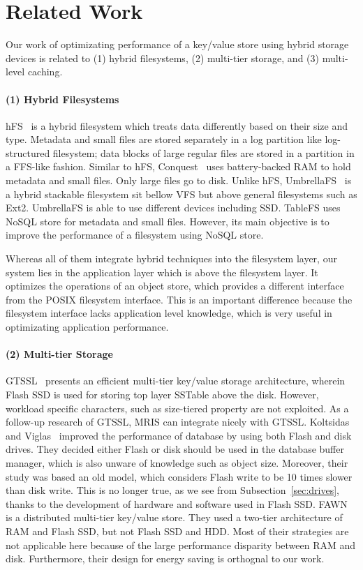 \section{Related Work} 
\label{sec:related} 
Our work of optimizating performance of a key/value store using hybrid
storage devices is related to (1) hybrid filesystems, (2) multi-tier
storage, and (3) multi-level caching. 

\paragraph{(1) Hybrid Filesystems}

hFS~\cite{eurosys_hfs} is a hybrid filesystem which treats data
differently based on their size and type. Metadata and small files are
stored separately in a log partition like log-structured filesystem;
data blocks of large regular files are stored in a partition in a
FFS-like fashion. Similar to hFS, Conquest~\cite{conquest_tos} uses
battery-backed RAM to hold metadata and small files. Only large files
go to disk. Unlike hFS, UmbrellaFS~\cite{umbrellafs_gos} is a hybrid
stackable filesystem sit bellow VFS but above general filesystems such
as Ext2.  UmbrellaFS is able to use different devices including SSD.
TableFS \cite{tablefs} uses NoSQL store for metadata and small files.
However, its main objective is to improve the performance of a
filesystem using NoSQL store.

Whereas all of them integrate hybrid techniques into the filesystem
layer, our system lies in the application layer which is above the
filesystem layer. It optimizes the operations of an object store,
which provides a different interface from the POSIX filesystem
interface. This is an important difference because the filesystem
interface lacks application level knowledge, which is very useful in
optimizating application performance.

\paragraph{(2) Multi-tier Storage}
%
GTSSL~\cite{socc11chisl} presents an efficient multi-tier key/value
storage architecture, wherein Flash SSD is used for storing top layer
SSTable above the disk. However, workload specific characters, such as
size-tiered property are not exploited. As a follow-up research of
GTSSL, MRIS can integrate nicely with GTSSL. Koltsidas and
Viglas~\cite{vldb_flashup} improved the performance of database by
using both Flash and disk drives. They decided either Flash or disk
should be used in the database buffer manager, which is also unware of
knowledge such as object size. Moreover, their study was based an old
model, which considers Flash write to be 10 times slower than disk
write. This is no longer true, as we see from
Subsection~\ref{sec:drives}, thanks to the development of hardware and
software used in Flash SSD. FAWN~\cite{sosp09fawn} is a distributed
multi-tier key/value store. They used a two-tier architecture of RAM
and Flash SSD, but not Flash SSD and HDD. Most of their strategies are
not applicable here because of the large performance disparity
between RAM and disk. Furthermore, their design for energy saving is
orthognal to our work.

